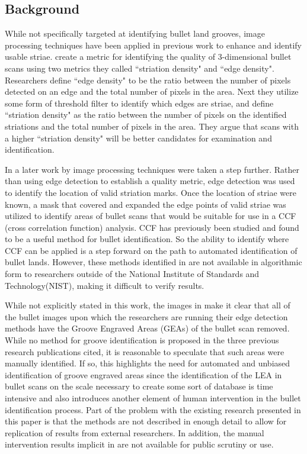 \documentclass[12pt]{article}\usepackage[]{graphicx}\usepackage[]{color}
\theoremstyle{nonumberplain}
\begin{document}
\subsection{Background}

While not specifically targeted at identifying bullet land grooves, image processing techniques have been applied in previous work to enhance and identify usable striae.  \citet{chu2010} create a metric for identifying the quality of 3-dimensional bullet scans using two metrics they called ``striation density" and ``edge density". Researchers define ``edge density" to be the ratio between the number of pixels detected on an edge and the total number of pixels in the area. Next they utilize some form of threshold filter to identify which edges are striae, and define ``striation density" as the ratio between the number of pixels on the identified striations and the total number of pixels in the area. They argue that scans with a higher ``striation density" will be better candidates for examination and identification. 

In a later work  by \citet{chu2013} image processing techniques were taken a step further. Rather than using edge detection to establish a quality metric, edge detection was used to identify the location of valid striation marks. Once the location of striae were known, a mask that covered and expanded the edge points of valid striae was utilized to identify areas of bullet scans that would be suitable for use in a CCF (cross correlation function) analysis. CCF has previously been studied \cite{chu2010-ccf} and found to be a useful method for bullet identification. So the ability to identify where CCF can be applied is a step forward on the path to automated identification of bullet lands. However, these methods identified in \cite{chu2013} are not available in algorithmic form to researchers outside of the National Institute of Standards and Technology(NIST), making it difficult to verify results.  

While not explicitly stated in this work, the images in \cite{chu2013} make it clear that all of the bullet images upon which the researchers are running their edge detection methods have the Groove Engraved Areas (GEAs) of the bullet scan removed. While no method for groove identification is proposed in the three previous research publications cited, it is reasonable to speculate that such areas were manually identified. If so, this highlights the need for automated and unbiased identification of groove engraved areas since the identification of the LEA in bullet scans on the scale necessary to create some sort of database is time intensive and also introduces another element of human intervention in the bullet identification process. Part of the problem with the existing research presented in this paper is that the methods are not described in enough detail to allow for replication of results from external researchers. In addition, the manual intervention results implicit in  are not available for public scrutiny or use. 
\end{document}
